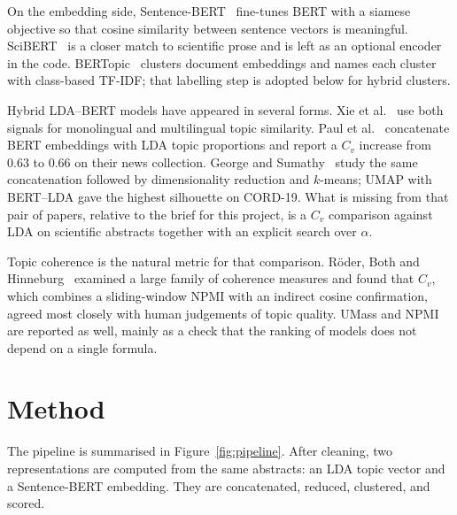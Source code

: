 \documentclass[11pt,a4paper]{article}
\begin{document}
On the embedding side, Sentence-BERT~\cite{reimers2019} fine-tunes BERT with a siamese objective so that cosine similarity between sentence vectors is meaningful. SciBERT~\cite{beltagy2019} is a closer match to scientific prose and is left as an optional encoder in the code. BERTopic~\cite{grootendorst2022} clusters document embeddings and names each cluster with class-based TF-IDF; that labelling step is adopted below for hybrid clusters.

Hybrid LDA--BERT models have appeared in several forms. Xie et al.~\cite{xie2020} use both signals for monolingual and multilingual topic similarity. Paul et al.~\cite{paul2025} concatenate BERT embeddings with LDA topic proportions and report a $C_v$ increase from $0.63$ to $0.66$ on their news collection. George and Sumathy~\cite{george2023} study the same concatenation followed by dimensionality reduction and $k$-means; UMAP with BERT--LDA gave the highest silhouette on CORD-19. What is missing from that pair of papers, relative to the brief for this project, is a $C_v$ comparison against LDA on scientific abstracts together with an explicit search over $\alpha$.

Topic coherence is the natural metric for that comparison. R\"oder, Both and Hinneburg~\cite{roder2015} examined a large family of coherence measures and found that $C_v$, which combines a sliding-window NPMI with an indirect cosine confirmation, agreed most closely with human judgements of topic quality. UMass and NPMI are reported as well, mainly as a check that the ranking of models does not depend on a single formula.

\section{Method}
\label{sec:method}

The pipeline is summarised in Figure~\ref{fig:pipeline}. After cleaning, two representations are computed from the same abstracts: an LDA topic vector and a Sentence-BERT embedding. They are concatenated, reduced, clustered, and scored.
\end{document}
